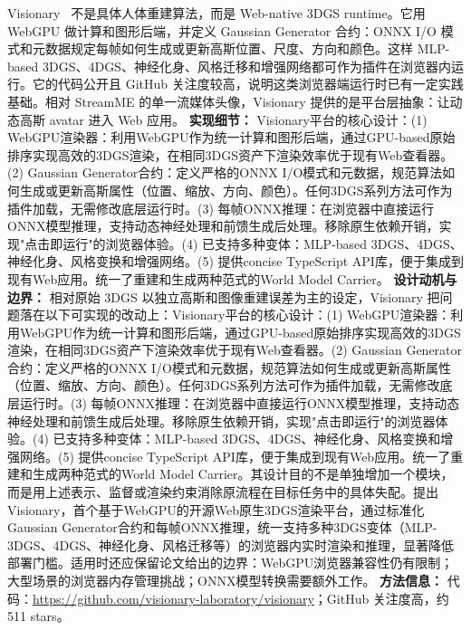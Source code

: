 Visionary~\cite{2512_08478} 不是具体人体重建算法，而是 Web-native 3DGS runtime。它用 WebGPU 做计算和图形后端，并定义 Gaussian Generator 合约：ONNX I/O 模式和元数据规定每帧如何生成或更新高斯位置、尺度、方向和颜色。这样 MLP-based 3DGS、4DGS、神经化身、风格迁移和增强网络都可作为插件在浏览器内运行。它的代码公开且 GitHub 关注度较高，说明这类浏览器端运行时已有一定实践基础。相对 StreamME 的单一流媒体头像，Visionary 提供的是平台层抽象：让动态高斯 avatar 进入 Web 应用。
\textbf{实现细节：} Visionary平台的核心设计：(1) WebGPU渲染器：利用WebGPU作为统一计算和图形后端，通过GPU-based原始排序实现高效的3DGS渲染，在相同3DGS资产下渲染效率优于现有Web查看器。(2) Gaussian Generator合约：定义严格的ONNX I/O模式和元数据，规范算法如何生成或更新高斯属性（位置、缩放、方向、颜色）。任何3DGS系列方法可作为插件加载，无需修改底层运行时。(3) 每帧ONNX推理：在浏览器中直接运行ONNX模型推理，支持动态神经处理和前馈生成后处理。移除原生依赖开销，实现"点击即运行"的浏览器体验。(4) 已支持多种变体：MLP-based 3DGS、4DGS、神经化身、风格变换和增强网络。(5) 提供concise TypeScript API库，便于集成到现有Web应用。统一了重建和生成两种范式的World Model Carrier。
\textbf{设计动机与边界：} 相对原始 3DGS 以独立高斯和图像重建误差为主的设定，Visionary 把问题落在以下可实现的改动上：Visionary平台的核心设计：(1) WebGPU渲染器：利用WebGPU作为统一计算和图形后端，通过GPU-based原始排序实现高效的3DGS渲染，在相同3DGS资产下渲染效率优于现有Web查看器。(2) Gaussian Generator合约：定义严格的ONNX I/O模式和元数据，规范算法如何生成或更新高斯属性（位置、缩放、方向、颜色）。任何3DGS系列方法可作为插件加载，无需修改底层运行时。(3) 每帧ONNX推理：在浏览器中直接运行ONNX模型推理，支持动态神经处理和前馈生成后处理。移除原生依赖开销，实现"点击即运行"的浏览器体验。(4) 已支持多种变体：MLP-based 3DGS、4DGS、神经化身、风格变换和增强网络。(5) 提供concise TypeScript API库，便于集成到现有Web应用。统一了重建和生成两种范式的World Model Carrier。其设计目的不是单独增加一个模块，而是用上述表示、监督或渲染约束消除原流程在目标任务中的具体失配。提出Visionary，首个基于WebGPU的开源Web原生3DGS渲染平台，通过标准化Gaussian Generator合约和每帧ONNX推理，统一支持多种3DGS变体（MLP-3DGS、4DGS、神经化身、风格迁移等）的浏览器内实时渲染和推理，显著降低部署门槛。适用时还应保留论文给出的边界：WebGPU浏览器兼容性仍有限制；大型场景的浏览器内存管理挑战；ONNX模型转换需要额外工作。
\textbf{方法信息：} 代码：\url{https://github.com/visionary-laboratory/visionary}；GitHub 关注度高，约 511 stars。



